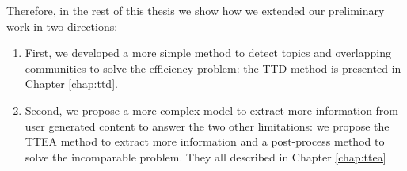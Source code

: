 Therefore, in the rest of this thesis we show how we extended our preliminary work in two directions:

\begin{enumerate}
 \item First, we developed a more simple method to detect topics and overlapping communities to solve the efficiency problem: the TTD method is presented in Chapter \ref{chap:ttd}.
  \item Second, we propose a more complex model to extract more information from user generated content to answer the two other limitations: we propose the TTEA method to extract more information and a post-process method to solve the incomparable problem. They all described in Chapter \ref{chap:ttea}
 
\end{enumerate}
 
